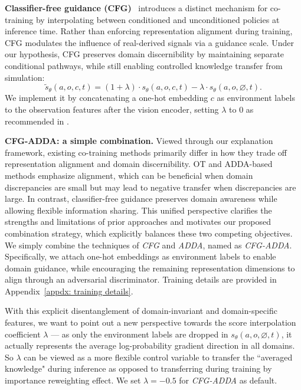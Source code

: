 \textbf{Classifier-free guidance (CFG)}~\cite{ho2022classifier} introduces a distinct mechanism for co-training by interpolating between conditioned and unconditioned policies at inference time.
Rather than enforcing representation alignment during training, CFG modulates the influence of real-derived signals via a guidance scale.
Under our hypothesis, CFG preserves domain discernibility by maintaining separate conditional pathways, while still enabling controlled knowledge transfer from simulation:
\begin{equation}
    \tilde{s}_\theta (a,o,c,t) = (1+\lambda)\cdot s_\theta(a,o,c,t) - \lambda \cdot s_\theta(a,o,\varnothing,t).
\end{equation}
We implement it by concatenating a one-hot embedding $c$ as environment labels to the observation features after the vision encoder, setting $\lambda$ to $0$ as recommended in \citet{wei2025empirical}.

\textbf{CFG-ADDA: a simple combination.}
Viewed through our explanation framework, existing co-training methods primarily differ in how they trade off representation alignment and domain discernibility.
OT and ADDA-based methods emphasize alignment, which can be beneficial when domain discrepancies are small but may lead to negative transfer when discrepancies are large.
In contrast, classifier-free guidance preserves domain awareness while allowing flexible information sharing.
This unified perspective clarifies the strengths and limitations of prior approaches and motivates our proposed combination strategy, which explicitly balances these two competing objectives.
We simply combine the techniques of \textit{CFG} and \textit{ADDA}, named as \textit{CFG-ADDA}. Specifically, we attach one-hot embeddings as environment labels to enable domain guidance, while encouraging the remaining representation dimensions to align through an adversarial discriminator. 
Training details are provided in Appendix~\ref{appdx: training details}.

With this explicit disentanglement of domain-invariant and domain-specific features, we want to point out a new perspective towards the score interpolation coefficient $\lambda$ --- as only the environment labels are dropped in $s_\theta(a,o,\varnothing,t)$, it actually represents the average log-probability gradient direction in all domains.
So $\lambda$ can be viewed as a more flexible control variable to transfer the ``averaged knowledge" during inference as opposed to transferring during training by importance reweighting effect.
We set $\lambda=-0.5$ for \textit{CFG-ADDA} as default.

